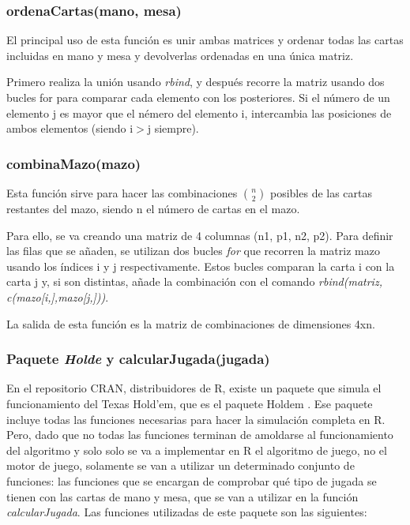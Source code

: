 \subsubsection{ordenaCartas(mano, mesa)}

El principal uso de esta función es unir ambas matrices y ordenar todas las cartas incluidas en mano y mesa y devolverlas ordenadas en una única matriz. 

Primero realiza la unión usando \textit{rbind}, y después recorre la matriz usando dos bucles for para comparar cada elemento con los posteriores. Si el número de un elemento j es mayor que el némero del elemento i, intercambia las posiciones de ambos elementos (siendo i$>$j siempre).
\subsubsection{combinaMazo(mazo)}

Esta función sirve para hacer las combinaciones $\binom{n}{2}$ posibles de las cartas restantes del mazo, siendo n el número de cartas en el mazo.

Para ello, se va creando una matriz de 4 columnas (n1, p1, n2, p2). Para definir las filas que se añaden, se utilizan dos bucles \textit{for} que recorren la matriz mazo usando los índices i y j respectivamente. Estos bucles comparan la carta i con la carta j y, si son distintas, añade la combinación con el comando \textit{rbind(matriz, c(mazo[i,],mazo[j,]))}.

La salida de esta función es la matriz de combinaciones de dimensiones 4xn. 

\subsubsection{Paquete \textit{Holde} y calcularJugada(jugada)}

En el repositorio CRAN, distribuidores de R, existe un paquete que simula el funcionamiento del Texas Hold'em, que es el paquete Holdem \cite{holdem}. Ese paquete incluye todas las funciones necesarias para hacer la simulación completa en R. Pero, dado que no todas las funciones terminan de amoldarse al funcionamiento del algoritmo y solo solo se va a implementar en R el algoritmo de juego, no el motor de juego, solamente se van a utilizar un determinado conjunto de funciones: las funciones que se encargan de comprobar qué tipo de jugada se tienen con las cartas de mano y mesa, que se van a utilizar en la función \textit{calcularJugada}.  Las funciones utilizadas de este paquete son las siguientes:

